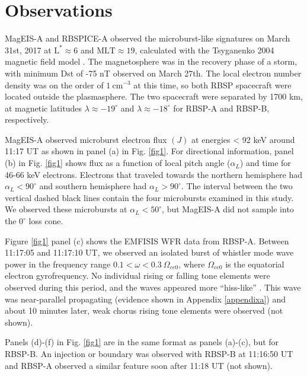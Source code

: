 \section{Observations} \label{obs}
MagEIS-A and RBSPICE-A observed the microburst-like signatures on March 31st, 2017 at $\mathrm{L}^* \approx 6$ and $\mathrm{MLT} \approx 19$, calculated with the Tsyganenko 2004 magnetic field model \citep{Tsyganenko2005}. The magnetosphere was in the recovery phase of a storm, with minimum Dst of -75 nT observed on March 27th. The local electron number density was on the order of $1 \ \mathrm{cm}^{-3}$ at this time, so both RBSP spacecraft were located outside the plasmasphere. The two spacecraft were separated by 1700 km, at magnetic latitudes $\lambda {\approx} -19^\circ$ and $\lambda {\approx} -18^\circ$ for RBSP-A and RBSP-B, respectively.

MagEIS-A observed microburst electron flux $(J)$ at energies < 92 keV around 11:17 UT as shown in panel (a) in Fig. \ref{fig1}. For directional information, panel (b) in Fig. \ref{fig1} shows flux as a function of local pitch angle ($\alpha_{L}$) and time for 46-66 keV electrons. Electrons that traveled towards the northern hemisphere had $\alpha_{L} < 90^\circ$ and southern hemisphere had $\alpha_{L} > 90^\circ$. The interval between the two vertical dashed black lines contain the four microbursts examined in this study. We observed these microbursts at $\alpha_{L} < 50^\circ$, but MagEIS-A did not sample into the $0^\circ$ loss cone.

Figure \ref{fig1} panel (c) shows the EMFISIS WFR data from RBSP-A. Between 11:17:05 and 11:17:10 UT, we observed an isolated burst of whistler mode wave power in the frequency range $0.1 < \omega < 0.3 \ \Omega_{ce0}$, where $\Omega_{ce0}$ is the equatorial electron gyrofrequency. No individual rising or falling tone elements were observed during this period, and the waves appeared more ``hiss-like'' \citep[e.g.][]{Li2012}. This wave was near-parallel propagating (evidence shown in Appendix \ref{appendixa}) and about 10 minutes later, weak chorus rising tone elements were observed (not shown).

Panels (d)-(f) in Fig. \ref{fig1} are in the same format as panels (a)-(c), but for RBSP-B. An injection or boundary was observed with RBSP-B at 11:16:50 UT and RBSP-A observed a similar feature soon after 11:18 UT (not shown).

